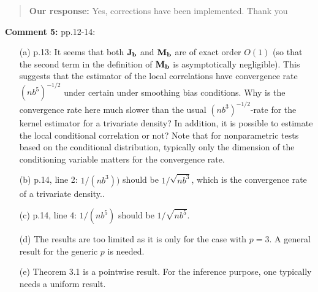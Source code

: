 \documentclass[
  12pt,
  letterpaper]{article}
\numberwithin{equation}{section}
\begin{document}
\begin{quote}
\textbf{Our response:} Yes, corrections have been implemented. Thank you
\end{quote}

\textbf{Comment 5:} pp.12-14:

\begin{itemize}

\item[(a)] p.13: It seems that both ${\bf J}_{\bf b}$ and ${\bf M}_{\bf b}$ are of exact order $O(1)$ (so that the second term in the definition of ${\bf M}_{\bf b}$ is asymptotically negligible). This suggests that the estimator of the local correlations have convergence rate $(nb^5)^{-1/2}$ under certain under smoothing bias conditions. Why is the convergence rate here much slower than the usual $(nb^3)^{-1/2}$-rate for the kernel estimator for a trivariate density? In addition, it is possible to estimate the local conditional correlation or not? Note that for nonparametric tests based on the conditional distribution, typically only the dimension of the conditioning variable matters for the convergence rate.
 
\item[(b)] p.14, line 2: $1/(nb^3))$ should be $1/\sqrt{nb^3}$, which is the convergence rate of a trivariate density..

\item [(c)] p.14, line 4: $1/(nb^5)$ should be $1/\sqrt{nb^5}$.

\item [(d)] The results are too limited as it is only for the case with $p=3$. A general result for the generic $p$ is needed.

\item [(e)] Theorem 3.1 is a pointwise result. For the inference purpose, one typically needs a uniform result.

\end{itemize}
\end{document}
